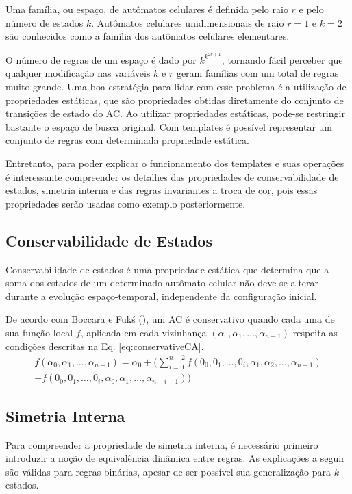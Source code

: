 \documentclass[12pt, a4paper]{article}
\begin{document}
Uma família, ou espaço, de autômatos celulares é definida pelo raio $r$ e pelo número de estados $k$. Autômatos celulares unidimensionais de raio $r=1$ e $k=2$ são conhecidos como a família dos autômatos celulares elementares.

O número de regras de um espaço é dado por $k^{k^{2r+1}}$, tornando fácil perceber que qualquer modificação nas variáveis $k$ e $r$ geram famílias com um total de regras muito grande. Uma boa estratégia para lidar com esse problema é a utilização de propriedades estáticas, que são propriedades obtidas diretamente do conjunto de transições de estado do AC. Ao utilizar propriedades estáticas, pode-se restringir bastante o espaço de busca original. Com templates é possível representar um conjunto de regras com determinada propriedade estática.

Entretanto, para poder explicar o funcionamento dos templates e suas operações é interessante compreender os detalhes das propriedades de conservabilidade de estados, simetria interna e das regras invariantes a troca de cor, pois essas propriedades serão usadas como exemplo posteriormente.

\subsection{Conservabilidade de Estados}
Conservabilidade de estados é uma propriedade estática que determina que a soma dos estados de um determinado autômato celular não deve se alterar durante a evolução espaço-temporal, independente da configuração inicial.

De acordo com Boccara e Fukś (\citeyear{boccara2002}), um AC é conservativo quando cada uma de sua função local $f$, aplicada em cada vizinhança $(\alpha_0,\alpha_1, \dots, \alpha_{n-1})$ respeita as condições descritas na Eq. \eqref{eq:conservativeCA}.
\begin{equation}
\begin{split}
f(\alpha_0,\alpha_1, \dots,\alpha_{n-1}) = \alpha_0 + (\sum_{i=0}^{n-2}f(0_0,0_1, \dots,0_i,\alpha_1,\alpha_2, \dots,\alpha_{n-1}) \\- f(0_0,0_1, \dots,0_i,\alpha_0,\alpha_1, \dots,\alpha_{n-i-1}))
\label{eq:conservativeCA}
\end{split}
\end{equation}

\subsection{Simetria Interna}
Para compreender a propriedade de simetria interna, é necessário primeiro introduzir a noção de equivalência dinâmica entre regras. As explicações a seguir são válidas para regras binárias, apesar de ser possível sua generalização para $k$ estados.
\end{document}
